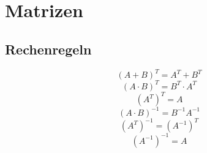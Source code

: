 
\section{Matrizen}

\subsection{Rechenregeln}
\[ (A + B)^T = A^T + B^T \]
\[ (A \cdot B)^T = B^T \cdot A^T \]
\[ (A^T)^T = A \]
\[ (A \cdot B)^{-1} = B^{-1} A^{-1} \]
\[ (A^T)^{-1} = (A^{-1})^T \]
\[ (A^{-1})^{-1} = A \]

